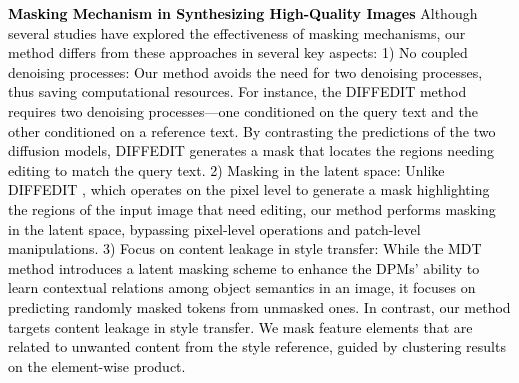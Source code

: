 \textcolor{black}{\textbf{Masking Mechanism in Synthesizing High-Quality Images}
Although several studies \citep{couairon2022diffedit, gao2023masked, hansen2024unified, pan2023masked, lei2023masked} have explored the effectiveness of masking mechanisms, our method differs from these approaches in several key aspects:
1) No coupled denoising processes: Our method avoids the need for two denoising processes, thus saving computational resources. For instance, the DIFFEDIT method \citep{couairon2022diffedit} requires two denoising processes—one conditioned on the query text and the other conditioned on a reference text. By contrasting the predictions of the two diffusion models, DIFFEDIT generates a mask that locates the regions needing editing to match the query text.
2) Masking in the latent space: Unlike DIFFEDIT \citep{couairon2022diffedit}, which operates on the pixel level to generate a mask highlighting the regions of the input image that need editing, our method performs masking in the latent space, bypassing pixel-level operations and patch-level manipulations.
3) Focus on content leakage in style transfer: While the MDT method \citep{gao2023masked} introduces a latent masking scheme to enhance the DPMs' ability to learn contextual relations among object semantics in an image, it focuses on predicting randomly masked tokens from unmasked ones. In contrast, our method targets content leakage in style transfer. We mask feature elements that are related to unwanted content from the style reference, guided by clustering results on the element-wise product. 
}